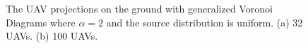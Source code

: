 \documentclass[12pt,onecolumn,final,letterpaper]{IEEEtran}
\newif\ifarxiv\arxivfalse
\begin{document}
\begin{figure}[t]
\centering
{}
\hfil
{}
\captionsetup{justification=justified}
\vspace{-2ex}
\caption{\small{The UAV projections on the ground with generalized Voronoi Diagrams where $\alpha=2$ and the source distribution is uniform. 
(a) 32 UAVs. (b) 100 UAVs.}}
\label{uniformDistortionPartition2}
\end{figure}
\ifarxiv
\end{document}
